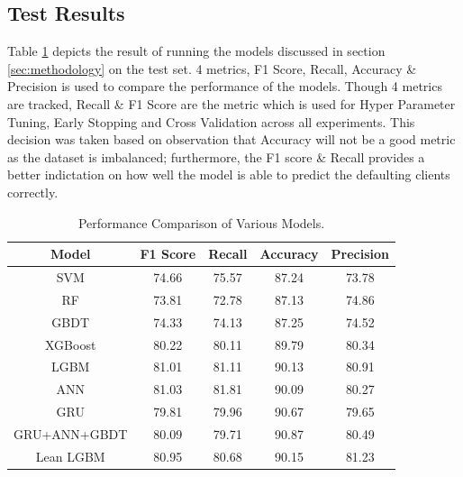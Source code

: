 \documentclass[twoside,11pt,a4paper]{article}
\begin{document}
\subsection{Test Results}
Table \ref{table:results} depicts the result of running the models discussed in section \ref{sec:methodology} on the test set. 4 metrics, F1 Score, Recall, Accuracy \& Precision is used to compare the performance of the models. Though 4 metrics are tracked, Recall \& F1 Score are the metric which is used for Hyper Parameter Tuning, Early Stopping and Cross Validation across all experiments. This decision was taken based on observation that Accuracy will not be a good metric as the dataset is imbalanced; furthermore, the F1 score \& Recall provides a better indictation on how well the model is able to predict the defaulting clients correctly.

\begin{table}[h]
	\begin{center}
		\begin{tabular}{|| c | c | c | c | c ||} 
			\hline
			Model & F1 Score & Recall & Accuracy & Precision \\ [0.5ex] 
			\hline\hline
			SVM	 & 74.66	& 75.57	& 87.24	& \cellcolor[HTML]{ff6666} 73.78 \\
			\hline
			RF	 & \cellcolor[HTML]{ff6666} 73.81	& \cellcolor[HTML]{ff6666} 72.78	& \cellcolor[HTML]{ff6666} 87.13	& 74.86 \\
			\hline
			GBDT	 & 74.33	& 74.13	& 87.25	& 74.52 \\
			\hline
			XGBoost	 & 80.22	& 80.11	& 89.79	& 80.34 \\
			\hline
			LGBM	 & 81.01	& 81.11	& 90.13	& 80.91 \\
			\hline
			ANN	 & \cellcolor[HTML]{339933} 81.03	&  \cellcolor[HTML]{339933} 81.81	& 90.09	& 80.27 \\
			\hline
			GRU	 & 79.81	& 79.96	& 90.67	& 79.65 \\
			\hline
			GRU+ANN+GBDT	 & 80.09	& 79.71	& \cellcolor[HTML]{339933} 90.87	& 80.49 \\
			\hline
			Lean LGBM	 & 80.95	& 80.68	& 90.15	& \cellcolor[HTML]{339933} 81.23 \\
			\hline
		\end{tabular}
		\caption{Performance Comparison of Various Models.}
		\label{table:results}
	\end{center}
\end{table}
\end{document}
